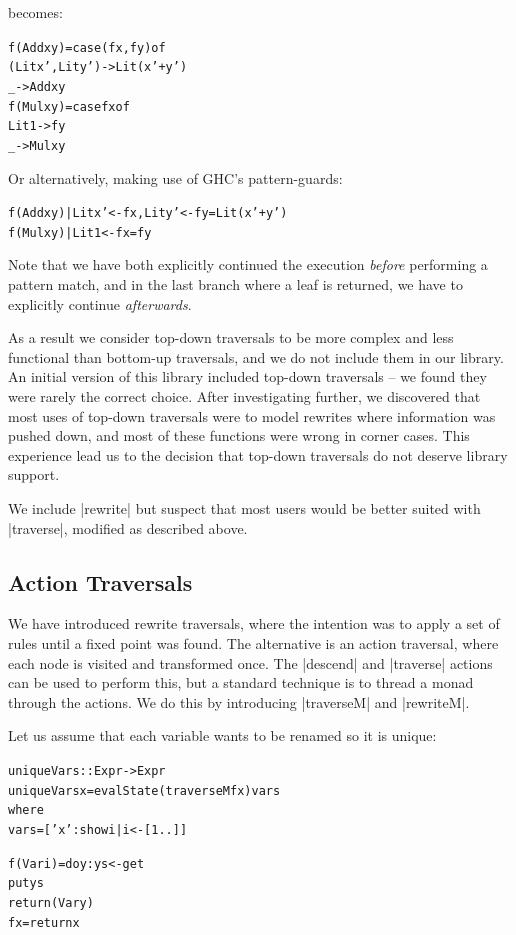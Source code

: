 \documentclass[preprint]{sigplanconf}
\newenvironment{code}{\begin{alltt}\small}{\end{alltt}}
\begin{document}
\noindent becomes:

\begin{code}
f (Add x y) = case  (f x     , f y     ) of
                    (Lit x'  , Lit y'  ) -> Lit (x'+y')
                    _ -> Add x y
f (Mul x y) = case  f x of
                    Lit 1 -> f y
                    _ -> Mul x y
\end{code}

\noindent Or alternatively, making use of GHC's pattern-guards:

\begin{code}
f (Add  x y) | Lit x'  <- f x, Lit y' <- f y = Lit (x'+y')
f (Mul  x y) | Lit 1   <- f x = f y
\end{code}

Note that we have both explicitly continued the execution \textit{before} performing a pattern match, and in the last branch where a leaf is returned, we have to explicitly continue \textit{afterwards}.

As a result we consider top-down traversals to be more complex and less functional than bottom-up traversals, and we do not include them in our library. An initial version of this library included top-down traversals -- we found they were rarely the correct choice. After investigating further, we discovered that most uses of top-down traversals were to model rewrites where information was pushed down, and most of these functions were wrong in corner cases. This experience lead us to the decision that top-down traversals do not deserve library support.

We include |rewrite| but suspect that most users would be better suited with |traverse|, modified as described above.

\subsection{Action Traversals}

We have introduced rewrite traversals, where the intention was to apply a set of rules until a fixed point was found. The alternative is an action traversal, where each node is visited and transformed once. The |descend| and |traverse| actions can be used to perform this, but a standard technique is to thread a monad through the actions. We do this by introducing |traverseM| and |rewriteM|.

Let us assume that each variable wants to be renamed so it is unique:

\begin{code}
uniqueVars :: Expr -> Expr
uniqueVars x = evalState (traverseM f x) vars
    where
        vars = ['x':show i | i <- [1..]]

        f (Var i)  = do  y:ys <- get
                         put ys
                         return (Var y)
        f x        = return x
\end{code}
\end{document}
